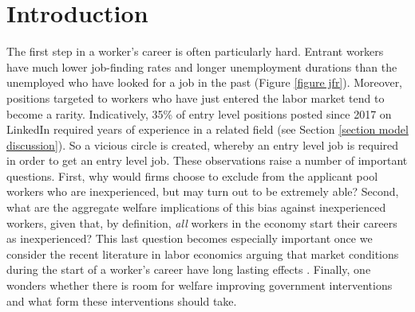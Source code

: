 \documentclass[12pt]{article} %
\theoremstyle{definition}
\begin{document}
\newpage
\setcounter{page}{1}
\normalsize

\section{Introduction}\label{intro} 

The first step in a worker's career is often particularly hard. Entrant workers have much lower job-finding rates and longer unemployment durations than the unemployed who have looked for a job in the past (Figure \ref{figure jfr}).
Moreover, positions targeted to workers who have just entered the labor market tend to become a rarity. Indicatively, 35\% of entry level positions posted since 2017 on LinkedIn required years of experience in a related field (see Section \ref{section model discussion}). So a vicious circle is created, whereby an entry level job is required in order to get an entry level job. These observations raise a number of important questions. First, why would firms choose to exclude from the applicant pool workers who are inexperienced, but may turn out to be extremely able? Second, what are the aggregate welfare implications of this bias against inexperienced workers, given that, by definition, \textit{all} workers in the economy start their careers as inexperienced? This last question becomes especially important once we consider the recent literature in labor economics arguing that market conditions during the start of a worker's career have long lasting effects \citep{wachter2020persistent}. Finally, one wonders whether there is room for welfare improving government interventions and what form these interventions should take.  

\end{document}
